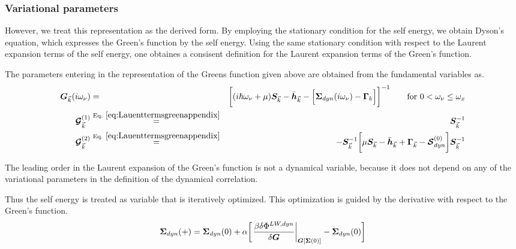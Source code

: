 \documentclass[11pt,a4paper]{report}
\begin{document}
\subsubsection{Variational parameters}
However, we treat this representation as the derived form.  By
employing the stationary condition for the self energy, we obtain
Dyson's equation, which expresses the Green's function by the self
energy. Using the same stationary condition with respect to the
Laurent expansion terms of the self energy, one obtaines a consisent
definition for the Laurent expansion terms of the Green's function.

The parameters entering in the representation
 of the Greens function given above are
obtained from the fundamental variables as.
\begin{eqnarray}
\mat{G}_{\vec{k}}(i\omega_\nu)&=&
\biggl[
(i\hbar\omega_\nu+\mu)\mat{S}_{\vec{k}}-\bar{\mat{h}}_{\vec{k}}
-
\Bigl[\mat{\Sigma}_{dyn}(i\omega_\nu)-\mat{\Gamma}_k\Bigr]
\biggr]^{-1}
\qquad\text{for $0<\omega_\nu\le\omega_x$}
\nonumber\\
\mat{\mathcal{G}}^{(1)}_{\vec{k}}
&\eqrel{eq:Lauenttermsgreenappendix}{=}&
\mat{S}_{\vec{k}}^{-1}
\nonumber\\
\mat{\mathcal{G}}^{(2)}_{\vec{k}}
&\eqrel{eq:Lauenttermsgreenappendix}{=}&
-\mat{S}_{\vec{k}}^{-1}
\biggl[\mu\mat{S}_{\vec{k}}-\bar{\mat{h}}_{\vec{k}}
+\mat{\Gamma}_{\vec{k}}-\mat{\mathcal{S}}^{(0)}_{dyn}
\biggr]
\mat{S}_{\vec{k}}^{-1}
\end{eqnarray}

The leading order in the Laurent expansion of the Green's function is
not a dynamical variable, because it does not depend on any of the
variational parameters in the definition of the dynamical correlation.


Thus the self energy is treated as variable that is iteratively
optimized. This optimization is guided by the derivative with respect
to the Green's function.
\begin{eqnarray}
\bm{\Sigma}_{dyn}(+)=\bm{\Sigma}_{dyn}(0)+\alpha
\biggl[\left.\frac{\beta\delta\Phi^{LW,dyn}}{\delta\bm{G}}
\right|_{\bm{G}[\bm{\Sigma}(0)]}
-\bm{\Sigma}_{dyn}(0)\biggr]
\end{eqnarray}
\end{document}
